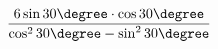 \begin{ex}[type=calculate]
	\begin{condition}
		\( \dfrac{6\sin30\degree\cdot\cos30\degree}{\cos^2 30\degree - \sin^2 30\degree} \)
	\end{condition}
\end{ex}